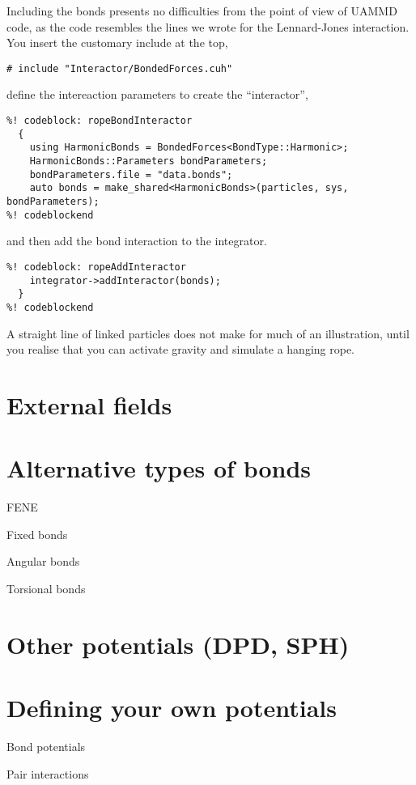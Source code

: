 Including the bonds presents no difficulties from the point of view of UAMMD
code, as the code resembles the lines we wrote for the Lennard-Jones
interaction. You insert the customary include at the top,
\begin{lstlisting}
# include "Interactor/BondedForces.cuh"
\end{lstlisting}
define the intereaction parameters to create the ``interactor'',
\begin{lstlisting}
%! codeblock: ropeBondInteractor
  {
    using HarmonicBonds = BondedForces<BondType::Harmonic>;
    HarmonicBonds::Parameters bondParameters;
    bondParameters.file = "data.bonds";
    auto bonds = make_shared<HarmonicBonds>(particles, sys, bondParameters);
%! codeblockend
\end{lstlisting}
and then add the bond interaction to the integrator.
\begin{lstlisting}
%! codeblock: ropeAddInteractor
    integrator->addInteractor(bonds);
  }
%! codeblockend
\end{lstlisting}

A straight line of linked particles does not make for much of an illustration,
until you realise that you can activate gravity and simulate a hanging rope.

\section{External fields}


\section{Alternative types of bonds}

FENE

Fixed bonds

Angular bonds

Torsional bonds

\section{Other potentials (DPD, SPH)}

\section{Defining your own potentials}

Bond potentials

Pair interactions
